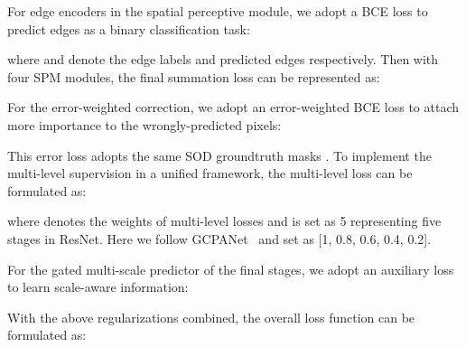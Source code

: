 \documentclass[journal]{IEEEtran}
\begin{document}
For edge encoders in the spatial perceptive module, we adopt a BCE loss to predict edges as a binary classification task:

where  and  denote the edge labels and predicted edges respectively. Then with four SPM modules, the final summation loss  can be represented as:


For the error-weighted correction, we adopt an error-weighted BCE loss to attach more importance to the wrongly-predicted pixels:

This error loss  adopts the same SOD groundtruth masks . To implement the multi-level supervision in a unified framework, the multi-level loss  can be formulated as:

where  denotes the weights of multi-level losses and  is set as 5 representing five stages in ResNet. Here we follow GCPANet~\cite{chen2020global} and set  as [1, 0.8, 0.6, 0.4, 0.2].

For the gated multi-scale predictor of the final  stages, we adopt an auxiliary loss  to learn scale-aware information:

With the above regularizations combined, the overall loss function  can be formulated as:
\end{document}
